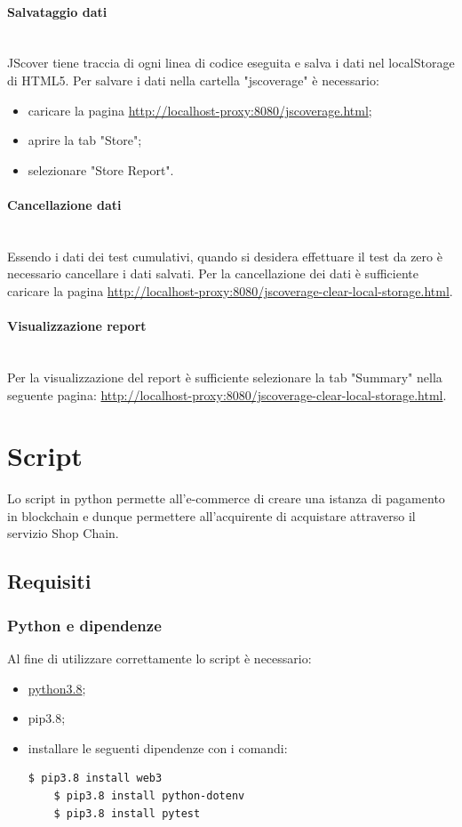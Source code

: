 \documentclass[a4paper, 12pt]{article}
\begin{document}
\paragraph{Salvataggio dati}\\
JScover tiene traccia di ogni linea di codice eseguita e salva i dati nel localStorage di HTML5. Per salvare i dati nella cartella "jscoverage" è necessario:
\begin{itemize}
  \item caricare la pagina \url{http://localhost-proxy:8080/jscoverage.html};
  \item aprire la tab "Store";
  \item selezionare "Store Report".
\end{itemize}
\paragraph{Cancellazione dati}\\
Essendo i dati dei test cumulativi, quando si desidera effettuare il test da zero è necessario cancellare i dati salvati. Per la cancellazione dei dati è sufficiente caricare la pagina \url{http://localhost-proxy:8080/jscoverage-clear-local-storage.html}.
\paragraph{Visualizzazione report}\\
Per la visualizzazione del report è sufficiente selezionare la tab "Summary" nella seguente pagina:  \url{http://localhost-proxy:8080/jscoverage-clear-local-storage.html}.
\newpage{}
\section{Script}
Lo script in python permette all'e-commerce di creare una istanza di pagamento in blockchain e dunque permettere all'acquirente di acquistare attraverso il servizio Shop Chain.
\subsection{Requisiti}
\subsubsection{Python e dipendenze}
Al fine di utilizzare correttamente lo script è necessario:
\begin{itemize}
  \item \href{https://www.python.org/downloads/}{python3.8};
  \item pip3.8;
  \item installare le seguenti dipendenze con i comandi:
  \begin{lstlisting}[language=bash]
    $ pip3.8 install web3
    $ pip3.8 install python-dotenv
    $ pip3.8 install pytest
  \end{lstlisting}
\end{itemize}
\end{document}
